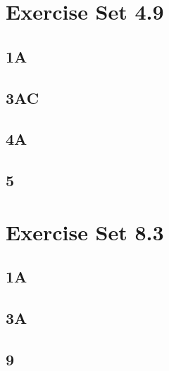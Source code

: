 \documentclass{oisinclass}
\begin{document}
\section*{Exercise Set 4.9}
\subsection*{1A}
\subsection*{3AC}
\subsection*{4A}
\subsection*{5}

\section*{Exercise Set 8.3}
\subsection*{1A}
\subsection*{3A}
\subsection*{9}
\end{document}
